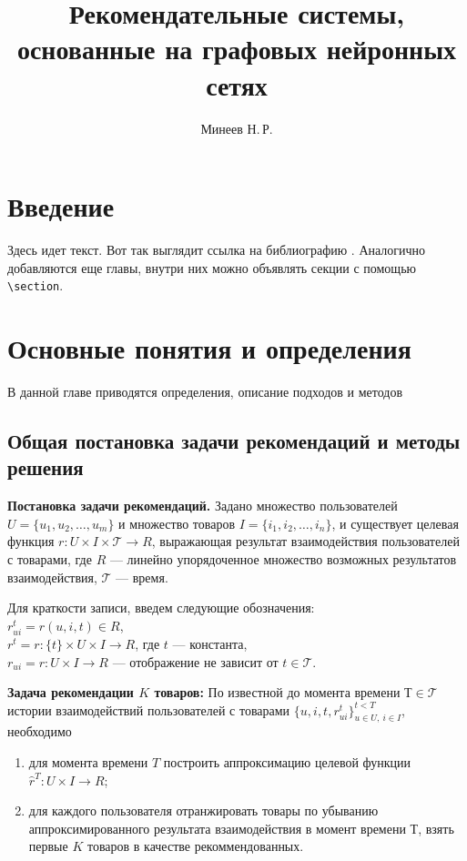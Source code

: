 \documentclass{mipt-thesis-ms}
\title{Рекомендательные системы, основанные на графовых нейронных сетях}
\author{Минеев Н.\,Р.}
\begin{document}
\frontmatter
\titlecontents

\mainmatter


\chapter{Введение}
Здесь идет текст. Вот так выглядит ссылка на библиографию \cite{langmuir26}. Аналогично добавляются еще главы, внутри них можно объявлять секции с помощью \verb|\section|.


\chapter{Основные понятия и определения}
В данной главе приводятся определения, описание подходов и методов

\section{Общая постановка задачи рекомендаций и методы решения}
{\bf Постановка задачи рекомендаций.} 
Задано множество пользователей $U = \{u_1, u_2, \dots, u_m\}$ и множество товаров $I = \{i_1, i_2, \dots, i_n\}$, и существует целевая функция $r: U \times I \times \mathcal{T} \rightarrow R$, выражающая результат взаимодействия пользователей с товарами, где $R$ --- линейно упорядоченное множество возможных результатов взаимодействия, $\mathcal{T}$ --- время.

Для краткости записи, введем следующие обозначения: \\
$r^t_{ui} = r(u, i, t) \in R$, \\
$r^t = r:\{t\} \times U \times I \rightarrow R$, где $t$ --- константа, \\
$r_{ui} = r: U \times I \rightarrow R$ --- отображение не зависит от $t \in \mathcal{T}$.

{\bf Задача рекомендации $K$ товаров:} По известной до момента времени $Т \in \mathcal{T}$ истории взаимодействий пользователей с товарами $\{u, i, t, r_{ui}^t\}^{t<T}_{u \in U,\:i \in I}$, необходимо 
\begin{enumerate}
    \item для момента времени $T$ построить аппроксимацию целевой функции $\hat r^T: U \times I \rightarrow R$;
    \item для каждого пользователя отранжировать товары по убыванию аппроксимированного результата взаимодействия в момент времени $Т$, взять первые $K$ товаров в качестве рекоммендованных.
\end{enumerate}
\end{document}
